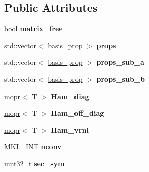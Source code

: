 \subsection*{Public Attributes}
\begin{DoxyCompactItemize}
\item 
\mbox{\label{classqbasis_1_1model_ac6b323e5157b0913715b03715b19085a}} 
bool {\bfseries matrix\+\_\+free}
\item 
\mbox{\label{classqbasis_1_1model_a668df54ccdd96edfafbba6260defc194}} 
std\+::vector$<$ \hyperlink{classqbasis_1_1basis__prop}{basis\+\_\+prop} $>$ {\bfseries props}
\item 
\mbox{\label{classqbasis_1_1model_ab3f6cb6df8646075c0f5d24beb8f48b3}} 
std\+::vector$<$ \hyperlink{classqbasis_1_1basis__prop}{basis\+\_\+prop} $>$ {\bfseries props\+\_\+sub\+\_\+a}
\item 
\mbox{\label{classqbasis_1_1model_a4d7f901a74ba9cf5456941f5e09a2617}} 
std\+::vector$<$ \hyperlink{classqbasis_1_1basis__prop}{basis\+\_\+prop} $>$ {\bfseries props\+\_\+sub\+\_\+b}
\item 
\mbox{\label{classqbasis_1_1model_a392f3c9eabe563eed6c03263bc1e846b}} 
\hyperlink{classqbasis_1_1mopr}{mopr}$<$ T $>$ {\bfseries Ham\+\_\+diag}
\item 
\mbox{\label{classqbasis_1_1model_acd3346629679b2ac9956326bcfe96356}} 
\hyperlink{classqbasis_1_1mopr}{mopr}$<$ T $>$ {\bfseries Ham\+\_\+off\+\_\+diag}
\item 
\mbox{\label{classqbasis_1_1model_a029c5221b0e421f688dd2981b4fca827}} 
\hyperlink{classqbasis_1_1mopr}{mopr}$<$ T $>$ {\bfseries Ham\+\_\+vrnl}
\item 
\mbox{\label{classqbasis_1_1model_a0688325251300aeb2207c458bf660217}} 
M\+K\+L\+\_\+\+I\+NT {\bfseries nconv}
\item 
\mbox{\label{classqbasis_1_1model_a37a2212d4ce8daf963149b5356ff3590}} 
uint32\+\_\+t {\bfseries sec\+\_\+sym}
\item 

\end{DoxyCompactItemize}
